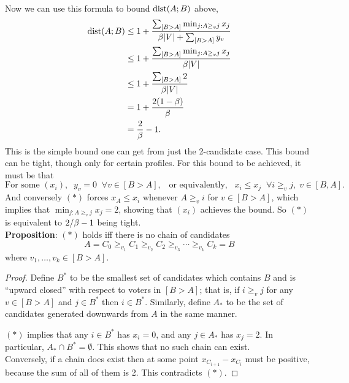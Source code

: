 \documentclass{amsart}
\DeclareMathOperator{\dist}{\rm{dist}}
\begin{document}
Now we can use this formula to bound $\dist(A;B)$ above,
\begin{align*}
	\dist(A;B) &\leq 1 + \frac{\sum_{[B>A]} \min_{j:A\geq_v j} x_j}{ \b |V| + \sum_{[B>A]} y_v} \\
	&\leq 1 + \frac{\sum_{[B>A]} \min_{j:A\geq_v j} x_j}{ \b |V|} \\
	&\leq  1 + \frac{\sum_{[B>A]} 2}{ \b |V|} \\
	&= 1 + \frac{2(1-\b)}{\b}\\
	&= \frac{2}{\b} - 1.
\end{align*}
This is the simple bound one can get from just the 2-candidate case. This bound can be tight, though only for certain profiles. For this bound to be achieved, it must be that 
\begin{equation}
	\tag{$\ast$}
	\text{For some $(x_i)$}, \;\; y_v = 0 \;\; \forall v\in [B>A], \;\;\; \text{or equivalently,} \;\;\; x_i \leq x_j \;\; \forall i \geq_v j, \; v\in [B,A].
\end{equation}
And conversely $(\ast)$ forces $x_A \leq x_i$ whenever $A\geq_v i$ for $v\in [B>A]$, which implies that $\min_{j:A\geq_v j} x_j = 2$, showing that $(x_i)$ achieves the bound. So $(\ast)$ is equivalent to $2/\beta - 1$ being tight.\\

%

\textbf{Proposition}: $(\ast)$ holds iff there is no chain of candidates 
$$
A = C_0\geq_{v_1} C_1 \geq_{v_2} C_2 \geq_{v_3} \cdots \geq_{v_{k}} C_{k} = B
$$
where $v_1,\dots,v_k\in [B>A]$.
\begin{proof}
	Define $B^*$ to be the smallest set of candidates which contains $B$ and is ``upward closed'' with respect to voters in $[B>A]$; that is, if $i\geq_v j$ for any $v\in[B>A]$ and $j\in B^*$ then $i\in B^*$. Similarly, define $A_*$ to be the set of candidates generated downwards from $A$ in the same manner.
	
	$(\ast)$ implies that any $i\in B^*$ has $x_i=0$, and any $j\in A_*$ has $x_j=2$. In particular, $A_*\cap B^*=\emptyset$. This shows that no such chain can exist.\\
	
	Conversely, if a chain does exist then at some point $x_{C_{i+1}} - x_{C_i}$ must be positive, because the sum of all of them is 2. This contradicts $(\ast)$. 
\end{proof}\\
\end{document}
